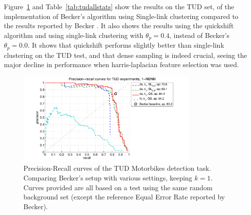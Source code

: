 Figure~\ref{fig:tudk1prc} and Table~\ref{tab:tudallstats} show the results on the TUD set, of the implementation of Becker's algorithm using Single-link clustering compared to the results reported by Becker \cite{becker2012codebook}. It also shows the results using the quickshift algorithm and using single-link clustering with $\theta_p = 0.4$, instead of Becker's $\theta_p = 0.0$. It shows that quickshift performs slightly better than single-link clustering on the TUD test, and that dense sampling is indeed crucial, seeing the major decline in performance when harris-laplacian feature selection was used.

\begin{figure}[hbt]
    \centering
    \includegraphics[width=0.8\textwidth]{TUDk1prc}
    \caption{Precision-Recall curves of the TUD Motorbikes detection task. Comparing Becker's \cite{becker2012codebook} setup with various settings, keeping $k=1$. Curves provided are all based on a test using the same random background set (except the reference Equal Error Rate reported by Becker).}
    \label{fig:tudk1prc}
\end{figure}

